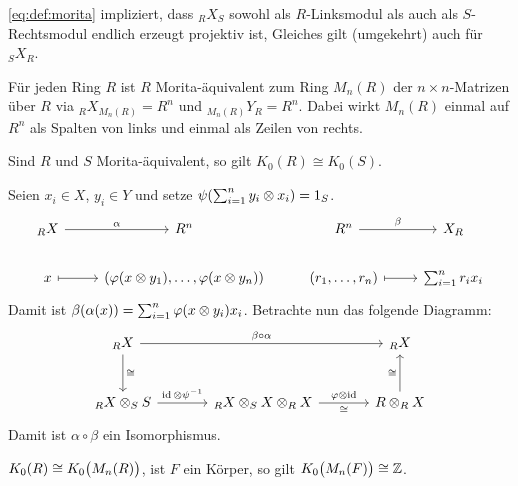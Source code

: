 \begin{bemerkung}
	\eqref{eq:def:morita} impliziert, dass $_R X_S$ sowohl als $R$-Linksmodul als auch als $S$-Rechtsmodul endlich erzeugt projektiv ist,
	Gleiches gilt (umgekehrt) auch für ${_S X_R}$.
\end{bemerkung}

\begin{beispiel}
	Für jeden Ring $R$ ist $R$ Morita-äquivalent zum Ring $M_n(R)$ der $n \times n$-Matrizen über $R$ via ${_R X_{M_n(R)}}=R^n$ und $_{M_n(R)} Y_R = R^n$.
	Dabei wirkt $M_n(R)$ einmal auf $R^n$ als Spalten von links und einmal als Zeilen von rechts.
\end{beispiel}

\begin{satz}[{name=[K0 ist Morita-invariant]}]
	Sind $R$ und $S$ Morita-äquivalent, so gilt $K_0(R) \cong K_0(S)$.
\end{satz}
\begin{beweis}
	Seien $x_i \in X$, $y_i \in Y$ und setze $\psi \enbrace*{\sum_{i=1}^{n} y_i \otimes x_i} = 1_S$.
	\[
		\begin{tikzcd}
			_R X \rar["\alpha"] & R^n & R^n \rar["\beta"] & X_R \\
			x \rar[mapsto] & \enbrace*{\varphi(x \otimes y_1), \ldots , \varphi(x \otimes y_n)} & (r_1, \ldots ,r_n) \rar[mapsto] & \sum_{i=1}^{n} r_i x_i
		\end{tikzcd}
	\]
	Damit ist $\beta \enbrace{\alpha(x)} = \sum_{i=1}^{n} \varphi(x \otimes y_i) x_i$.
	Betrachte nun das folgende Diagramm:
	\[
		\begin{tikzcd}[sep=large]
			_R X \ar[rr,"\beta \circ \alpha"] \dar["\cong"] & & _R X \\
			{_R X} \otimes_S S \rar["\id \otimes \psi^{-1}"]  & {_R X} \otimes_S X \otimes_R X \rar["\varphi \otimes {\id}","\cong"'] & R \otimes_R X \uar["\cong"]
		\end{tikzcd}
	\]
	Damit ist $\alpha \circ \beta$ ein Isomorphismus.
\end{beweis}

\begin{korollarB}
	$K_0(R) \cong K_0 \enbrace[\big]{M_n(R)}$, ist $F$ ein Körper, so gilt $K_0 \enbrace[\big]{M_n(F)} \cong \mathbb{Z}$.
\end{korollarB}

